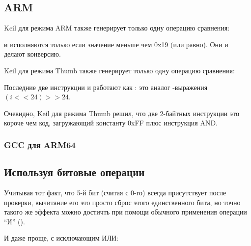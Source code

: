 \subsection{ARM}

\Optimizing Keil для режима ARM также генерирует только одну операцию сравнения:




 и  исполняются только если значение  меньше чем 0x19 (или равно).
Они и делают конверсию.

\Optimizing Keil для режима Thumb также генерирует только одну операцию сравнения:




Последние две инструкции  и  работают как :
это аналог \CCpp-выражения $(i<<24)>>24$.

Очевидно, Keil для режима Thumb решил, что две 2-байтных инструкции это короче чем код, загружающий
константу 0xFF плюс инструкция AND.

\subsubsection{GCC для ARM64}





\subsection{Используя битовые операции}
\label{toupper_bit}

Учитывая тот факт, что 5-й бит (считая с 0-го) всегда присутствует после проверки, вычитание его это просто
сброс этого единственного бита, но точно такого же эффекта можно достичть при помощи обычного применения операции
``И'' ().

И даже проще, с исключающим ИЛИ:

